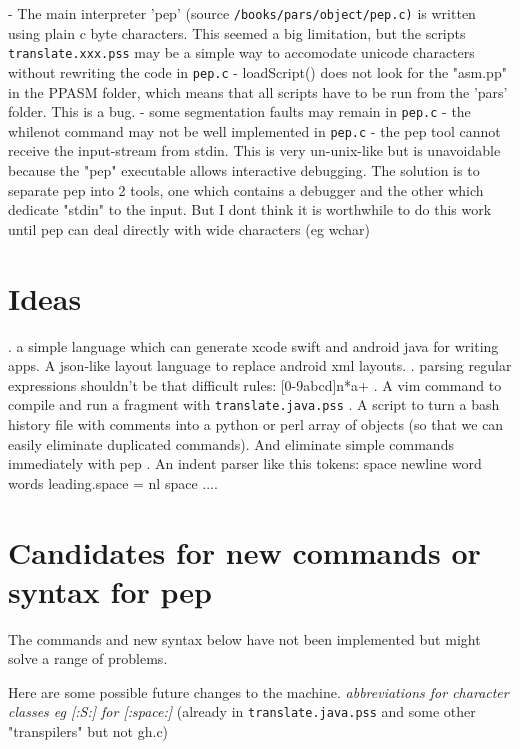 \documentclass[a4paper,12pt]{article}
\begin{document}
  - The main interpreter 'pep' (source \texttt{/books/pars/object/pep.c)} is
    written using plain c byte characters. This seemed a big limitation, but
    the scripts \texttt{translate.xxx.pss} may be a simple way to accomodate unicode
    characters without rewriting the code in \texttt{pep.c}
  - loadScript() does not look for the "asm.pp" in the PPASM folder,
    which means that all scripts have to be run from the 'pars' folder.
    This is a bug.
  - some segmentation faults may remain in \texttt{pep.c}
  - the whilenot command may not be well implemented in \texttt{pep.c}
  - the pep tool cannot receive the input-stream from stdin. This is
    very un-unix-like but is unavoidable because the "pep" executable
    allows interactive debugging. The solution is to
    separate pep into 2 tools, one which contains a debugger and the
    other which dedicate "stdin" to the input. But I dont think it is
    worthwhile to do this work until pep can deal directly with
    wide characters (eg wchar)

\section{Ideas}

  . a simple language which can generate xcode swift and android
    java for writing apps. A json-like layout language to replace
    android xml layouts.
  . parsing regular expressions shouldn't be that difficult
    rules:
      [0-9abcd]n*a+
  . A vim command to compile and run a fragment with \texttt{translate.java.pss}
  . A script to turn a bash history file with comments into
    a python or perl array of objects (so that we can easily
    eliminate duplicated commands). And eliminate simple commands
    immediately with pep
  . An indent parser like this
    tokens: space newline word words
    leading.space = nl space ....

\section{Candidates for new commands or syntax for pep}

  The commands and new syntax below have not been implemented
  but might solve a range of problems.

  Here are some possible future changes to the machine.
 \emph{ abbreviations for character classes eg [:S:] for [:space:] }
    (already in \texttt{translate.java.pss} and some other "transpilers"
    but not gh.c)
\end{document}
